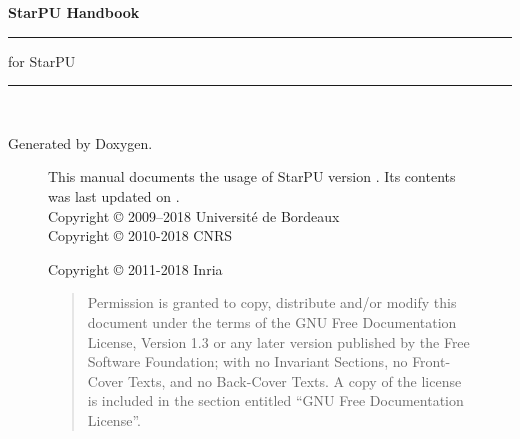 %
%
%
%
%

\begin{titlepage}
\vspace*{4cm}
{\Huge \textbf{StarPU Handbook}}\\
\rule{\textwidth}{1.5mm}
\begin{flushright}
{\Large for StarPU \STARPUVERSION}
\end{flushright}
\rule{\textwidth}{1mm}
~\\
\vspace*{15cm}
\begin{flushright}
Generated by Doxygen.
\end{flushright}
\end{titlepage}

\begin{figure}[p]
This manual documents the usage of StarPU version \STARPUVERSION. Its contents
was last updated on \STARPUUPDATED.\\

Copyright © 2009–2018 Université de Bordeaux\\

Copyright © 2010-2018 CNRS

Copyright © 2011-2018 Inria

\medskip

\begin{quote}
Permission is granted to copy, distribute and/or modify this document
under the terms of the GNU Free Documentation License, Version 1.3 or
any later version published by the Free Software Foundation; with no
Invariant Sections, no Front-Cover Texts, and no Back-Cover Texts. A
copy of the license is included in the section entitled “GNU Free
Documentation License”.
\end{quote}
\end{figure}

